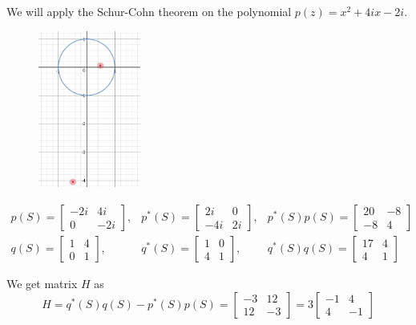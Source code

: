 \documentclass[twoside]{article}
\newcommand*\adj[1]{#1^*}
\theoremstyle{plain}
\theoremstyle{definition}
\theoremstyle{remark}
\begin{document}
We will apply the Schur-Cohn theorem on the polynomial \(p(z) = x^2 + 4i x - 2i\).

\begin{figure}
\centering
\includegraphics[width=0.3\textwidth]{roots1}
\end{figure}

 \[\begin{array}{ccc}
 p(S) = \begin{bmatrix} -2i & 4i \\0 &  -2i \end{bmatrix}, & \adj{p}(S) = \begin{bmatrix} 2i & 0 \\-4i  & 2i \end{bmatrix}, &\adj{p}(S) p(S) = \begin{bmatrix} 20 & -8 \\ -8 & 4 \end{bmatrix} \\
 q(S) = \begin{bmatrix} 1 & 4 \\0 & 1 \end{bmatrix}, & \adj{q}(S) =\begin{bmatrix}1 & 0 \\4 & 1 \end{bmatrix}, &\adj{q}(S) q(S) = \begin{bmatrix} 17 & 4 \\ 4 & 1 \end{bmatrix}
\end{array}\]

We get matrix \(H\) as 
\[H = \adj{q}(S) q(S) - \adj{p}(S) p(S) = \begin{bmatrix} -3 & 12 \\ 12 & -3 \end{bmatrix} = 3 \begin{bmatrix} -1 & 4 \\ 4 & -1 \end{bmatrix}\]
\end{document}
